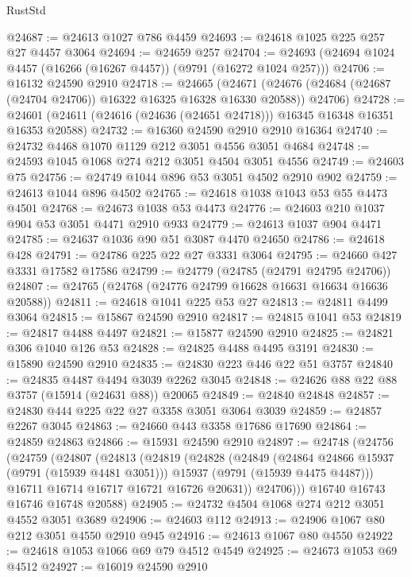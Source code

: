 \begin{lexlean}{RustStd}
\begin{coremodule}
@24687 := @24613 @1027 @786 @4459
@24693 := @24618 @1025 @225 @257 @27 @4457 @3064
@24694 := @24659 @257
@24704 := @24693 (@24694 @1024 @4457 (@16266 (@16267 @4457)) (@9791 (@16272 @1024 @257)))
@24706 := @16132 @24590 @2910
@24718 := @24665
    (@24671 (@24676 (@24684 (@24687 (@24704 @24706)) @16322 @16325 @16328 @16330 @20588)) @24706)
@24728 := @24601 (@24611 (@24616 (@24636 (@24651 @24718))) @16345 @16348 @16351 @16353 @20588)
@24732 := @16360 @24590 @2910 @2910 @16364
@24740 := @24732 @4468 @1070 @1129 @212 @3051 @4556 @3051 @4684
@24748 := @24593 @1045 @1068 @274 @212 @3051 @4504 @3051 @4556
@24749 := @24603 @75
@24756 := @24749 @1044 @896 @53 @3051 @4502 @2910 @902
@24759 := @24613 @1044 @896 @4502
@24765 := @24618 @1038 @1043 @53 @55 @4473 @4501
@24768 := @24673 @1038 @53 @4473
@24776 := @24603 @210 @1037 @904 @53 @3051 @4471 @2910 @933
@24779 := @24613 @1037 @904 @4471
@24785 := @24637 @1036 @90 @51 @3087 @4470 @24650
@24786 := @24618 @428
@24791 := @24786 @225 @22 @27 @3331 @3064
@24795 := @24660 @427 @3331 @17582 @17586
@24799 := @24779 (@24785 (@24791 @24795 @24706))
@24807 := @24765 (@24768 (@24776 @24799 @16628 @16631 @16634 @16636 @20588))
@24811 := @24618 @1041 @225 @53 @27
@24813 := @24811 @4499 @3064
@24815 := @15867 @24590 @2910
@24817 := @24815 @1041 @53
@24819 := @24817 @4488 @4497
@24821 := @15877 @24590 @2910
@24825 := @24821 @306 @1040 @126 @53
@24828 := @24825 @4488 @4495 @3191
@24830 := @15890 @24590 @2910
@24835 := @24830 @223 @446 @22 @51 @3757
@24840 := @24835 @4487 @4494 @3039 @2262 @3045
@24848 := @24626 @88 @22 @88 @3757 (@15914 (@24631 @88)) @20065
@24849 := @24840 @24848
@24857 := @24830 @444 @225 @22 @27 @3358 @3051 @3064 @3039
@24859 := @24857 @2267 @3045
@24863 := @24660 @443 @3358 @17686 @17690
@24864 := @24859 @24863
@24866 := @15931 @24590 @2910
@24897 := @24748
    (@24756
      (@24759
        (@24807
          (@24813
            (@24819
              (@24828
                (@24849
                  (@24864 @24866 @15937 (@9791 (@15939 @4481 @3051)))
                  @15937
                  (@9791 (@15939 @4475 @4487)))
                @16711
                @16714
                @16717
                @16721
                @16726
                @20631))
            @24706)))
      @16740
      @16743
      @16746
      @16748
      @20588)
@24905 := @24732 @4504 @1068 @274 @212 @3051 @4552 @3051 @3689
@24906 := @24603 @112
@24913 := @24906 @1067 @80 @212 @3051 @4550 @2910 @945
@24916 := @24613 @1067 @80 @4550
@24922 := @24618 @1053 @1066 @69 @79 @4512 @4549
@24925 := @24673 @1053 @69 @4512
@24927 := @16019 @24590 @2910

\end{coremodule}
\end{lexlean}
